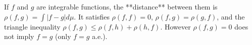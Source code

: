 If $f$ and $g$ are integrable functions, the **distance** between them is $\rho(f,g) = \int |f - g| d\mu$. It satisfies $\rho(f,f)=0$, $\rho(f,g)=\rho(g,f)$, and the triangle inequality $\rho(f,g) \leq \rho(f,h) + \rho(h,f)$. However $\rho(f,g)=0$ does not imply $f=g$ (only $f=g$ a.e.).
